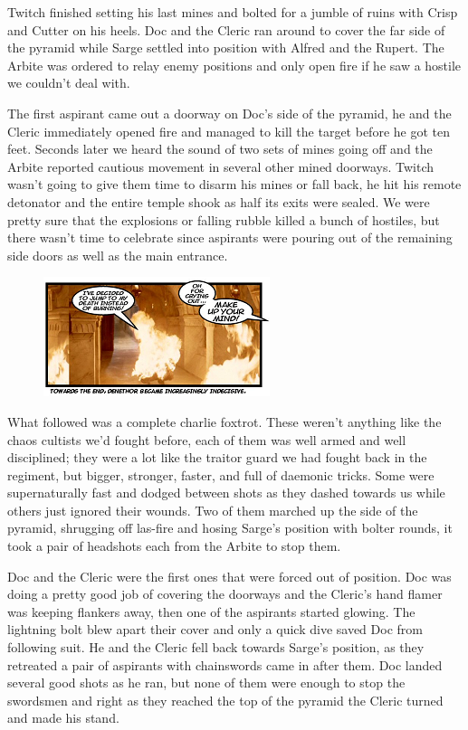 Twitch finished setting his last mines and bolted for a jumble of ruins with Crisp and Cutter on his heels. 
Doc and the Cleric ran around to cover the far side of the pyramid while Sarge settled into position with Alfred and the Rupert. 
The Arbite was ordered to relay enemy positions and only open fire if he saw a hostile we couldn't deal with.

The first aspirant came out a doorway on Doc's side of the pyramid, he and the Cleric immediately opened fire and managed to kill the target before he got ten feet. 
Seconds later we heard the sound of two sets of mines going off and the Arbite reported cautious movement in several other mined doorways. 
Twitch wasn't going to give them time to disarm his mines or fall back, he hit his remote detonator and the entire temple shook as half its exits were sealed. 
We were pretty sure that the explosions or falling rubble killed a bunch of hostiles, but there wasn't time to celebrate since aspirants were pouring out of the remaining side doors as well as the main entrance.

\begin{figure}
	\begin{center}
		\includegraphics[width=\figwidth]{pics/6/41.png}
	\end{center}
\end{figure}
What followed was a complete charlie foxtrot. 
These weren't anything like the chaos cultists we'd fought before, each of them was well armed and well disciplined; they were a lot like the traitor guard we had fought back in the regiment, but bigger, stronger, faster, and full of daemonic tricks. 
Some were supernaturally fast and dodged between shots as they dashed towards us while others just ignored their wounds. 
Two of them marched up the side of the pyramid, shrugging off las-fire and hosing Sarge's position with bolter rounds, it took a pair of headshots each from the Arbite to stop them.

Doc and the Cleric were the first ones that were forced out of position. 
Doc was doing a pretty good job of covering the doorways and the Cleric's hand flamer was keeping flankers away, then one of the aspirants started glowing. 
The lightning bolt blew apart their cover and only a quick dive saved Doc from following suit. He and the Cleric fell back towards Sarge's position, as they retreated a pair of aspirants with chainswords came in after them. 
Doc landed several good shots as he ran, but none of them were enough to stop the swordsmen and right as they reached the top of the pyramid the Cleric turned and made his stand.

